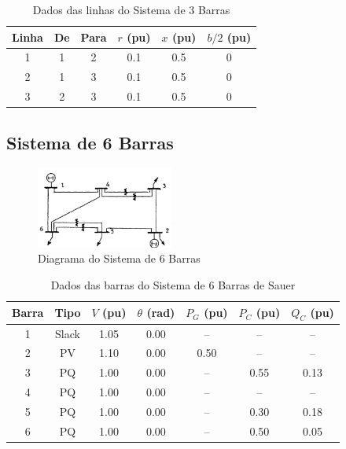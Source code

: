 \documentclass[journal]{IEEEtran}
\begin{document}
\vspace{1em}

\begin{table}[h!]
\centering
\caption{Dados das linhas do Sistema de 3 Barras}
\label{tab:3bus_linhas}
\begin{tabular}{c|c|c|c|c|c}
\hline
Linha & De & Para & $r$ (pu) & $x$ (pu) & $b/2$ (pu) \\
\hline
1 & 1 & 2 & 0.1 & 0.5 & 0 \\
2 & 1 & 3 & 0.1 & 0.5 & 0 \\
3 & 2 & 3 & 0.1 & 0.5 & 0 \\
\hline
\end{tabular}
\end{table}

\clearpage
\subsection{Sistema de 6 Barras}
\begin{figure}[h!]
  \centering
  \includegraphics[width=0.4\textwidth]{../images/6bus.png}
  \caption{Diagrama do Sistema de 6 Barras}
\end{figure}

\begin{table}[h!]
\centering
\caption{Dados das barras do Sistema de 6 Barras de Sauer}
\label{tab:sauer6bus_barras}
\begin{tabular}{c|c|c|c|c|c|c}
\hline
Barra & Tipo  & $V$ (pu) & $\theta$ (rad) & $P_{G}$ (pu) & $P_{C}$ (pu) & $Q_{C}$ (pu) \\
\hline
1 & Slack & 1.05 & 0.00 & --    & --    & --    \\
2 & PV    & 1.10 & 0.00 & 0.50  & --    & --    \\
3 & PQ    & 1.00 & 0.00 & --    & 0.55  & 0.13  \\
4 & PQ    & 1.00 & 0.00 & --    & --    & --    \\
5 & PQ    & 1.00 & 0.00 & --    & 0.30  & 0.18  \\
6 & PQ    & 1.00 & 0.00 & --    & 0.50  & 0.05  \\
\hline
\end{tabular}
\end{table}
\end{document}
